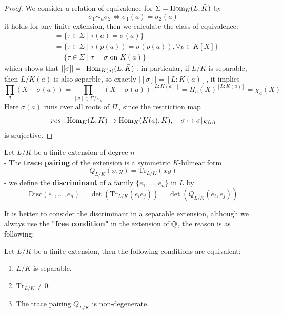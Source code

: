 \begin{proof}
  We consider a relation of equivalence for \(\Sigma = \operatorname{Hom}_{K}(L,\bar{K})\) by
  \[\sigma_1 \sim_a \sigma_2 \iff \sigma_1(a) = \sigma_2(a)\]
  it holds for any finite extension, then we calculate the class of equivalence:
  \begin{align*}
    [\sigma] &= \{\tau \in \Sigma \mid \tau(a) = \sigma(a)\} \\
    &= \{\tau \in \Sigma \mid \tau(p(a)) = \sigma(p(a)) , \forall p \in K[X]\}\\
    &= \{\tau \in \Sigma \mid \tau = \sigma \text{ on } K(a)\}
  \end{align*}
  which shows that \( |[\sigma]| = |\operatorname{Hom}_{K(a)}(L,\bar{K})|\), in particular, if \(L/K\) is separable, then \(L/K(a)\) is also separble, so exactly \(|[\sigma]| = [L:K(a)]\), it implies
  \[\prod_{\sigma}(X-\sigma(a)) = \prod_{[\sigma] \in \Sigma/\sim_a} (X-\sigma(a))^{[L:K(a)]} = \Pi_a(X)^{[L:K(a)]} = \chi_a(X)\]
  Here \(\sigma(a)\) runs over all roots of \(\Pi_a\) since the restriction map
\[res: \operatorname{Hom}_K(L,\bar{K}) \to \operatorname{Hom}_K(K(a),\bar{K}), \quad \sigma \mapsto \sigma|_{K(a)}\]
is srujective.

\end{proof}

\begin{definition}
  Let \(L/K\) be a finite extension of degree \(n\)\\
  - The \textbf{trace pairing} of the extension is a symmetric \(K\)-bilinear form
  \[Q_{L/K}(x,y) =  \mathrm{Tr}_{L/K}(xy)\]
  - we define the \textbf{discriminant} of a family \(\{e_1,\dots,e_n\}\) in \(L\)  by
\[\mathrm{Disc}(e_1,...,e_n) = \det(\mathrm{Tr}_{L/K}(e_ie_j)) = \det(Q_{L/K}(e_i,e_j)) \]
\end{definition}

It is better to consider the discriminant in a separable extension, although we always use the \textbf{"free condition"} in the extension of \(\mathbb{Q}\), the reason is as following:

\begin{proposition}
  Let \(L/K\) be a finite extension, then the following conditions are equivalent:
  \begin{enumerate}
    \item \(L/K\) is separable.
    \item \(\mathrm{Tr}_{L/K} \neq 0\).
    \item The trace pairing \(Q_{L/K}\) is non-degenerate.
  \end{enumerate}

\end{proposition}

